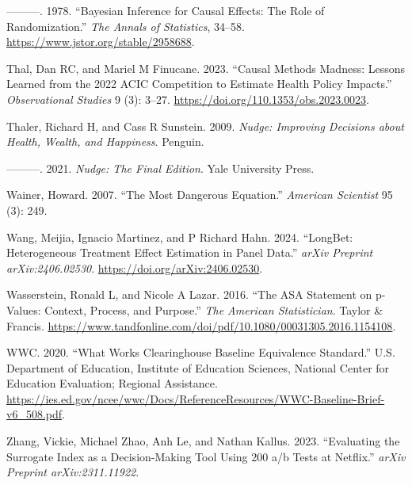 \documentclass[
  letterpaper,
  DIV=11,
  numbers=noendperiod]{scrreprt}
\newlength{\cslhangindent}
\newenvironment{CSLReferences}[2] %
 {\begin{list}{}{%
  \setlength{\itemindent}{0pt}
  \setlength{\leftmargin}{0pt}
  \setlength{\parsep}{0pt}
  \ifodd #1
   \setlength{\leftmargin}{\cslhangindent}
   \setlength{\itemindent}{-1\cslhangindent}
  \fi
  \setlength{\itemsep}{#2\baselineskip}}}
 {\end{list}}
\begin{document}
\begin{CSLReferences}{1}{0}
---------. 1978. {``Bayesian Inference for Causal Effects: The Role of
Randomization.''} \emph{The Annals of Statistics}, 34--58.
\url{https://www.jstor.org/stable/2958688}.

Thal, Dan RC, and Mariel M Finucane. 2023. {``Causal Methods Madness:
Lessons Learned from the 2022 ACIC Competition to Estimate Health Policy
Impacts.''} \emph{Observational Studies} 9 (3): 3--27.
\url{https://doi.org/110.1353/obs.2023.0023}.

Thaler, Richard H, and Cass R Sunstein. 2009. \emph{Nudge: Improving
Decisions about Health, Wealth, and Happiness}. Penguin.

---------. 2021. \emph{Nudge: The Final Edition}. Yale University Press.

Wainer, Howard. 2007. {``The Most Dangerous Equation.''} \emph{American
Scientist} 95 (3): 249.

Wang, Meijia, Ignacio Martinez, and P Richard Hahn. 2024. {``LongBet:
Heterogeneous Treatment Effect Estimation in Panel Data.''} \emph{arXiv
Preprint arXiv:2406.02530}. \url{https://doi.org/arXiv:2406.02530}.

Wasserstein, Ronald L, and Nicole A Lazar. 2016. {``The ASA Statement on
p-Values: Context, Process, and Purpose.''} \emph{The American
Statistician}. Taylor \& Francis.
\url{https://www.tandfonline.com/doi/pdf/10.1080/00031305.2016.1154108}.

WWC. 2020. {``What Works Clearinghouse Baseline Equivalence Standard.''}
U.S. Department of Education, Institute of Education Sciences, National
Center for Education Evaluation; Regional Assistance.
\url{https://ies.ed.gov/ncee/wwc/Docs/ReferenceResources/WWC-Baseline-Brief-v6_508.pdf}.

Zhang, Vickie, Michael Zhao, Anh Le, and Nathan Kallus. 2023.
{``Evaluating the Surrogate Index as a Decision-Making Tool Using 200
a/b Tests at Netflix.''} \emph{arXiv Preprint arXiv:2311.11922}.

\end{CSLReferences}
\end{document}
